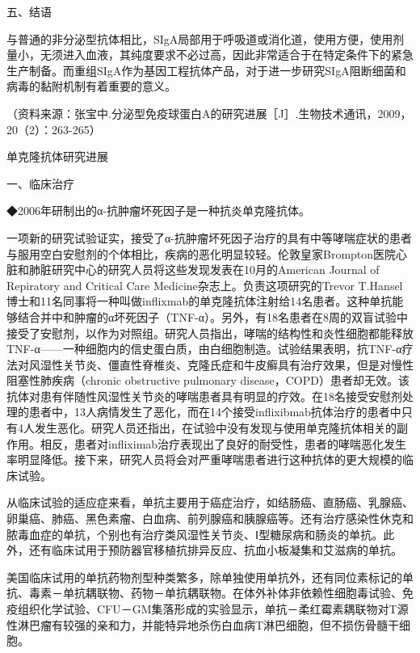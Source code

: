 \begin{center}
{\large 五、结语}
\end{center}
与普通的非分泌型抗体相比，SIgA局部用于呼吸道或消化道，使用方便，使用剂量小，无须进入血液，其纯度要求不必过高，因此非常适合于在特定条件下的紧急生产制备。而重组SIgA作为基因工程抗体产品，对于进一步研究SIgA阻断细菌和病毒的黏附机制有着重要的意义。

（资料来源：张宝中.分泌型免疫球蛋白A的研究进展［J］.生物技术通讯，2009，20（2）：263-265）

\begin{center}
{\Large 单克隆抗体研究进展}
\end{center}
\begin{center}
{\large 一、临床治疗}
\end{center}
◆2006年研制出的α-抗肿瘤坏死因子是一种抗炎单克隆抗体。

一项新的研究试验证实，接受了α-抗肿瘤坏死因子治疗的具有中等哮喘症状的患者与服用空白安慰剂的个体相比，疾病的恶化明显较轻。伦敦皇家Brompton医院心脏和肺脏研究中心的研究人员将这些发现发表在10月的American
Journal of Repiratory and Critical Care
Medicine杂志上。负责这项研究的Trevor
T.Hansel博士和11名同事将一种叫做inflixmab的单克隆抗体注射给14名患者。这种单抗能够结合并中和肿瘤的α坏死因子（TNF-α）。另外，有18名患者在8周的双盲试验中接受了安慰剂，以作为对照组。研究人员指出，哮喘的结构性和炎性细胞都能释放TNF-α------一种细胞内的信史蛋白质，由白细胞制造。试验结果表明，抗TNF-α疗法对风湿性关节炎、僵直性脊椎炎、克隆氏症和牛皮癣具有治疗效果，但是对慢性阻塞性肺疾病（chronic
obstructive pulmonary
disease，COPD）患者却无效。该抗体对患有伴随性风湿性关节炎的哮喘患者具有明显的疗效。在18名接受安慰剂处理的患者中，13人病情发生了恶化，而在14个接受inflixibmab抗体治疗的患者中只有4人发生恶化。研究人员还指出，在试验中没有发现与使用单克隆抗体相关的副作用。相反，患者对infliximab治疗表现出了良好的耐受性，患者的哮喘恶化发生率明显降低。接下来，研究人员将会对严重哮喘患者进行这种抗体的更大规模的临床试验。

从临床试验的适应症来看，单抗主要用于癌症治疗，如结肠癌、直肠癌、乳腺癌、卵巢癌、肺癌、黑色素瘤、白血病、前列腺癌和胰腺癌等。还有治疗感染性休克和脓毒血症的单抗，个别也有治疗类风湿性关节炎、Ⅰ型糖尿病和肠炎的单抗。此外，还有临床试用于预防器官移植抗排异反应、抗血小板凝集和艾滋病的单抗。

美国临床试用的单抗药物剂型种类繁多，除单独使用单抗外，还有同位素标记的单抗、毒素－单抗耦联物、药物－单抗耦联物。在体外补体非依赖性细胞毒试验、免疫组织化学试验、CFU－GM集落形成的实验显示，单抗－柔红霉素耦联物对T源性淋巴瘤有较强的亲和力，并能特异地杀伤白血病T淋巴细胞，但不损伤骨髓干细胞。

